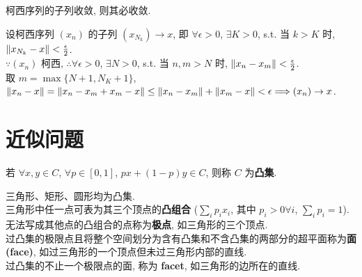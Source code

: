 \documentclass{note}
\begin{document}
\begin{cor}\label{cor-13.1}
    柯西序列的子列收敛, 则其必收敛.
\end{cor}
\begin{pf}
    设柯西序列 $(x_n)$ 的子列 $(x_{N_k})\rightarrow x$, 即 $\forall\epsilon>0$, $\exists K>0$, s.t. 当 $k>K$ 时, $\left\lVert x_{N_k}-x\right\rVert<\frac{\epsilon}{2}$.\\
    $\because(x_n)$ 柯西, $\therefore\forall\epsilon>0$, $\exists N>0$, s.t. 当 $n,m>N$ 时, $\left\lVert x_n-x_m\right\rVert<\frac{\epsilon}{2}$.\\
    取 $m=\max\{N+1,N_K+1\}$, $\left\lVert x_n-x\right\rVert=\left\lVert x_n-x_m+x_m-x\right\rVert\leq\left\lVert x_n-x_m\right\rVert+\left\lVert x_m-x\right\rVert<\epsilon\Longrightarrow(x_n)\rightarrow x$.
\end{pf}

\section{近似问题}
\begin{df}[凸集]
    若 $\forall x,y\in C$, $\forall p\in[0,1]$, $px+(1-p)y\in C$, 则称 $C$ 为\textbf{凸集}.
\end{df}
\begin{eg}
    三角形、矩形、圆形均为凸集.\\
    三角形中任一点可表为其三个顶点的\textbf{凸组合} ($\sum_ip_ix_i$, 其中 $p_i>0\forall i$, $\sum_ip_i=1$).\\
    无法写成其他点的凸组合的点称为\textbf{极点}, 如三角形的三个顶点.\\
    过凸集的极限点且将整个空间划分为含有凸集和不含凸集的两部分的超平面称为\textbf{面 (face)}, 如过三角形的一个顶点但未过三角形内部的直线.\\
    过凸集的不止一个极限点的面, 称为 \textbf{facet}, 如三角形的边所在的直线.
\end{eg}
\end{document}
